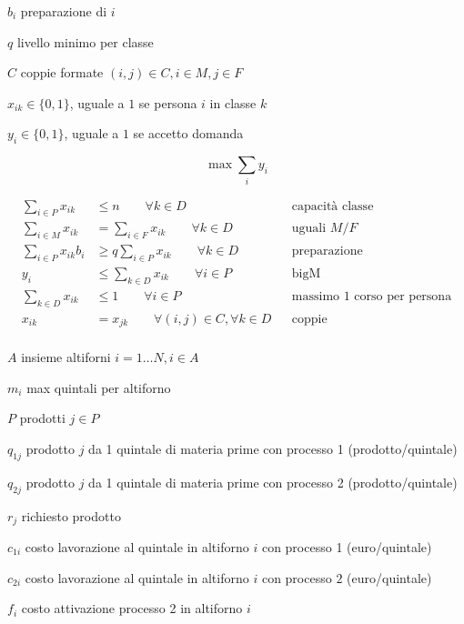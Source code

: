 $b_{i}$ preparazione di $i$

$q$ livello minimo per classe

$C$ coppie formate $( i,j) \in C,i\in M,j\in F$

\Var

$x_{ik} \in \{0,1\}$, uguale a $1$ se persona $i$ in classe $k$

$y_{i} \in \{0,1\}$, uguale a $1$ se accetto domanda

\Fob

\begin{equation*}
	\max\sum _{i} y_{i}
\end{equation*}

\Vin

\begin{align*}
	\sum _{i\in P} x_{ik} &\leq n\qquad\forall k\in D && \text{capacità classe} \\
	\sum _{i\in M} x_{ik} &=\sum _{i\in F} x_{ik} \qquad\forall k\in D && \text{uguali $M/F$} \\
	\sum _{i\in P} x_{ik} b_{i} &\geq q\sum _{i\in P} x_{ik} \qquad\forall k\in D && \text{preparazione} \\
	y_{i} &\leq \sum _{k\in D} x_{ik} \qquad\forall i\in P && \text{bigM} \\
	\sum _{k\in D} x_{ik} &\leq 1\qquad\forall i\in P && \text{massimo $1$ corso per persona} \\
	x_{ik} &=x_{jk} \qquad\forall (i,j)\in C,\forall k\in D && \text{coppie} \\
\end{align*}

\Es

\Par

$A$ insieme altiforni $i=1\dotsc N,i\in A$

$m_{i}$ max quintali per altiforno

$P$ prodotti $j\in P$

$q_{1j}$ prodotto $j$ da 1 quintale di materia prime con processo 1 (prodotto/quintale)

$q_{2j}$ prodotto $j$ da 1 quintale di materia prime con processo 2 (prodotto/quintale)

$r_{j}$ richiesto prodotto

$c_{1i}$ costo lavorazione al quintale in altiforno $i$ con processo 1 (euro/quintale)

$c_{2i}$ costo lavorazione al quintale in altiforno $i$ con processo $2$ (euro/quintale)

$f_{i}$ costo attivazione processo 2 in altiforno $i$

